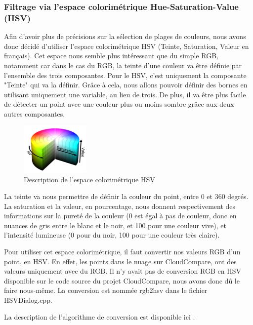 \documentclass[12pt,titlepage,french]{article}
\begin{document}
\subsubsection{Filtrage via l'espace colorimétrique Hue-Saturation-Value (HSV)}

Afin d'avoir plus de précisions sur la sélection de plages de couleurs, nous avons donc décidé d'utiliser l'espace colorimétrique HSV (Teinte, Saturation, Valeur en français). Cet espace nous semble plus intéressant que du simple RGB, notamment car dans le cas du RGB, la teinte d'une couleur va être définie par l'ensemble des trois composantes. Pour le HSV, c'est uniquement la composante "Teinte" qui va la définir. Grâce à cela, nous allons pouvoir définir des bornes en utilisant uniquement une variable, au lieu de trois. De plus, il va être plus facile de détecter un point avec une couleur plus ou moins sombre grâce aux deux autres composantes.

\begin{figure}[H]
\center
\includegraphics[width=0.3\textwidth]{./img/HSV.png}
\caption{\label{} Description de l'espace colorimétrique HSV}
\end{figure}

La teinte va nous permettre de définir la couleur du point, entre 0 et 360 degrés. La saturation et la valeur, en pourcentage, nous donnent respectivement des informations sur la pureté de la couleur (0 est égal à pas de couleur, donc en nuances de gris entre le blanc et le noir, et 100 pour une couleur vive), et l'intensité lumineuse (0 pour du noir, 100 pour une couleur très claire). \newline

Pour utiliser cet espace colorimétrique, il faut convertir nos valeurs RGB d'un point, en HSV. En effet, les points dans le nuage sur CloudCompare, ont des valeurs uniquement avec du RGB. Il n'y avait pas de conversion RGB en HSV disponible sur le code source du projet CloudCompare, nous avons donc dû le faire nous-même. La conversion est nommée rgb2hsv dans le fichier HSVDialog.cpp. \newline

La description de l'algorithme de conversion est disponible ici \cite{B02}. \newline
\end{document}
